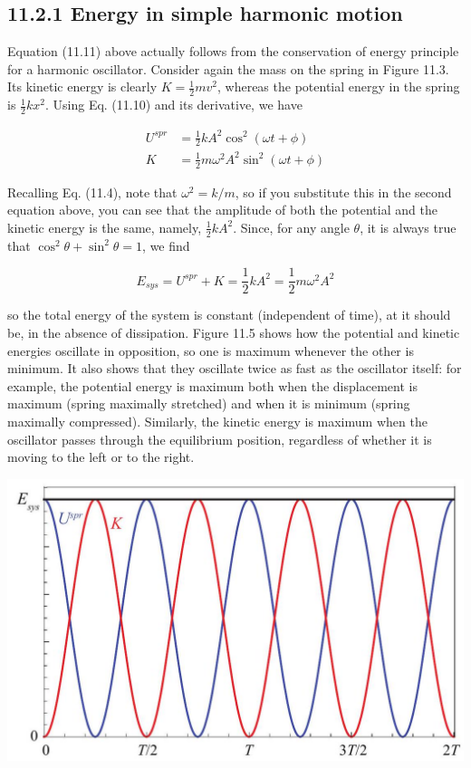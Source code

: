 \documentclass[10pt]{article}
\begin{document}
\subsection*{11.2.1 Energy in simple harmonic motion}
Equation (11.11) above actually follows from the conservation of energy principle for a harmonic oscillator. Consider again the mass on the spring in Figure 11.3. Its kinetic energy is clearly $K=\frac{1}{2} m v^{2}$, whereas the potential energy in the spring is $\frac{1}{2} k x^{2}$. Using Eq. (11.10) and its derivative, we have


\begin{align*}
U^{s p r} & =\frac{1}{2} k A^{2} \cos ^{2}(\omega t+\phi) \\
K & =\frac{1}{2} m \omega^{2} A^{2} \sin ^{2}(\omega t+\phi) \tag{11.13}
\end{align*}


Recalling Eq. (11.4), note that $\omega^{2}=k / m$, so if you substitute this in the second equation above, you can see that the amplitude of both the potential and the kinetic energy is the same, namely, $\frac{1}{2} k A^{2}$. Since, for any angle $\theta$, it is always true that $\cos ^{2} \theta+\sin ^{2} \theta=1$, we find


\begin{equation*}
E_{s y s}=U^{s p r}+K=\frac{1}{2} k A^{2}=\frac{1}{2} m \omega^{2} A^{2} \tag{11.14}
\end{equation*}


so the total energy of the system is constant (independent of time), at it should be, in the absence of dissipation. Figure 11.5 shows how the potential and kinetic energies oscillate in opposition, so one is maximum whenever the other is minimum. It also shows that they oscillate twice as fast as the oscillator itself: for example, the potential energy is maximum both when the displacement is maximum (spring maximally stretched) and when it is minimum (spring maximally compressed). Similarly, the kinetic energy is maximum when the oscillator passes through the equilibrium position, regardless of whether it is moving to the left or to the right.

\begin{center}
\includegraphics[max width=\textwidth]{2024_09_14_9969b06773f10b6936e8g-278}
\end{center}
\end{document}
